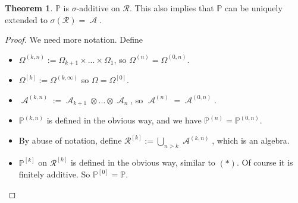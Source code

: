 \documentclass[12pt,a4paper]{report}
\theoremstyle{definition}
\newtheorem{theorem}{Theorem}[chapter] %
\theoremstyle{num.custom-title}
\DeclareMathOperator{\A}{\mathcal{A}}
\newcommand{\RR}{\mathcal{R}}
\renewcommand{\1}{\mathbbm{1}}
\renewcommand{\P}{\mathbb{P}}
\begin{document}
\begin{theorem}
$\P$ is $\sigma$-additive on $\RR$. This also implies that $\P$ can be uniquely extended to $\sigma(\RR)=\A$.
\begin{proof}
We need more notation. Define
\begin{itemize}
\item $\Omega^{(k,n)} := \Omega_{k+1} \times ... \times \Omega_1$, so $\Omega^{(n)} = \Omega^{(0,n)}$.
\item $\Omega^{[k]} := \Omega^{(k,\infty)}$ so $\Omega = \Omega^{[0]}$.
\item $\A^{(k,n)} := \A_{k+1} \otimes ... \otimes \A_n$, so $\A^{(n)} = \A^{(0,n)}$.
\item $\P^{(k,n)}$ is defined in the obvious way, and we have $\P^{(n)} = \P^{(0,n)}$.
\item By abuse of notation, define $\RR^{[k]} := \bigcup_{n>k} \A^{(k,n)}$, which is an algebra.
\item $\P^{[k]}$ on $\RR^{[k]}$ is defined in the obvious way, similar to $(*)$. Of course it is finitely additive. So $\P^{[0]} = \P$.
\end{itemize}


\end{proof}
\end{theorem}
\end{document}
